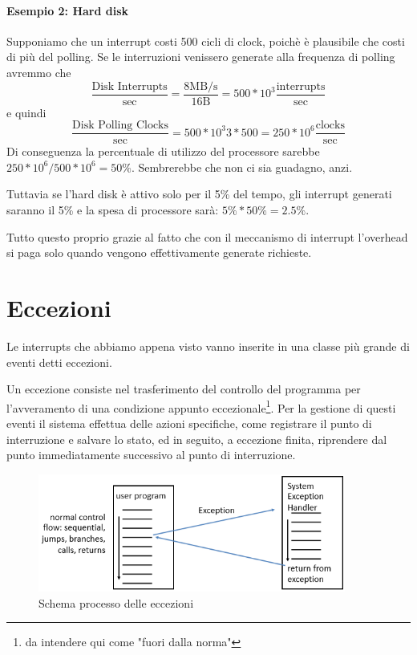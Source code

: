 \documentclass[class=book, crop=false, oneside]{standalone}
\begin{document}
\paragraph{Esempio 2: Hard disk} Supponiamo che un interrupt costi 500 cicli di clock, poichè è plausibile che costi di più del polling.
Se le interruzioni venissero generate alla frequenza di polling avremmo che \[\frac{\textrm{Disk Interrupts}}{\textrm{sec}}=\frac{8 \textrm{MB/s}}{16\textrm{B}}=500*10^{3}\frac{\textrm{interrupts}}{\textrm{sec}}\] e quindi \[\frac{\textrm{Disk Polling Clocks}}{\textrm{sec}}=500*10^3{3}*500=250*10^{6} \frac{\textrm{clocks}}{\textrm{sec}}\] Di conseguenza la percentuale di utilizzo del processore sarebbe \(250*10^{6}/500*10^{6}= 50\%\). Sembrerebbe che non ci sia guadagno, anzi.

Tuttavia se l’hard disk è attivo solo per il 5\% del tempo, gli interrupt generati saranno il 5\% e la spesa di processore sarà: \(5\% * 50\%=2.5\%\).

Tutto questo proprio grazie al fatto che con il meccanismo di interrupt l’overhead si paga solo quando vengono effettivamente generate richieste.

\section{Eccezioni}
Le interrupts che abbiamo appena visto vanno inserite in una classe più grande di eventi detti eccezioni.

Un eccezione consiste nel trasferimento del controllo del programma per l'avveramento di una condizione appunto eccezionale\footnote{da intendere qui come "fuori dalla norma"}.
Per la gestione di questi eventi il sistema effettua delle azioni specifiche, come registrare il punto di interruzione e salvare lo stato, ed in seguito, a eccezione finita, riprendere dal punto immediatamente successivo al punto di interruzione.

\begin{figure}[H]
	\centering
	\includegraphics[width=0.9\textwidth,keepaspectratio]{schema-eccezioni}
	\caption{Schema processo delle eccezioni}
\end{figure}
\end{document}
